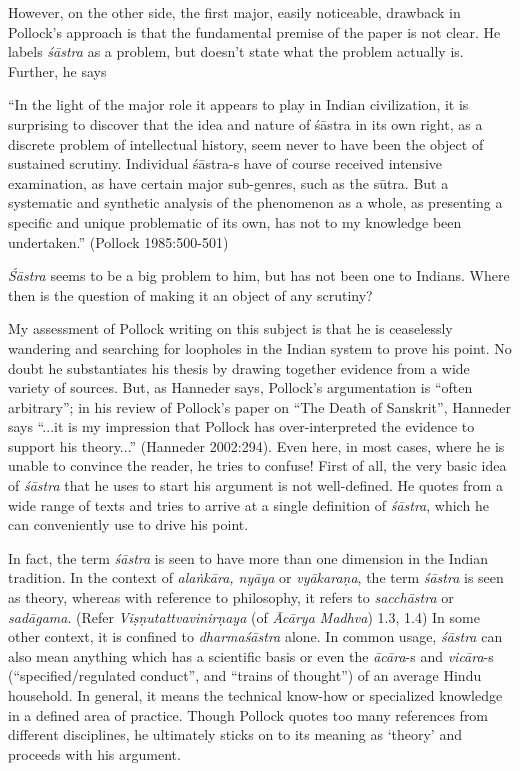 However, on the other side, the first major, easily noticeable, drawback in Pollock's approach is that the fundamental premise of the paper is not clear. He labels {\it śāstra} as a problem, but doesn't state what the problem actually is. Further, he says
\begin{myquote}
``In the light of the major role it appears to play in Indian civilization, it is surprising to discover that the idea and nature of śāstra in its own right, as a discrete problem of intellectual history, seem never to have been the object of sustained scrutiny. Individual śāstra-s have of course received intensive examination, as have certain major sub-genres, such as the sūtra. But a systematic and synthetic analysis of the phenomenon as a whole, as presenting a specific and unique problematic of its own, has not to my knowledge been undertaken.'' (Pollock 1985:500-501)
\end{myquote}

{\it Śāstra} seems to be a big problem to him, but has not been one to Indians. Where then is the question of making it an object of any scrutiny? 

My assessment of Pollock writing on this subject is that he is ceaselessly wandering and searching for loopholes in the Indian system to prove his point. No doubt he substantiates his thesis by drawing together evidence from a wide variety of sources. But, as Hanneder says, Pollock's argumentation is ``often arbitrary''; in his review of Pollock's paper on ``The Death of Sanskrit'', Hanneder says ``...it is my impression that Pollock has over-interpreted the evidence to support his theory...'' (Hanneder 2002:294). Even here, in most cases, where he is unable to convince the reader, he tries to confuse! First of all, the very basic idea of {\it śāstra} that he uses to start his argument is not well-defined. He quotes from a wide range of texts and tries to arrive at a single definition of {\it śāstra}, which he can conveniently use to drive his point. 

In fact, the term {\it śāstra} is seen to have more than one dimension in the Indian tradition. In the context of {\it alaṅkāra, nyāya} or {\it vyākaraṇa}, the term {\it śāstra} is seen as theory, whereas with reference to philosophy, it refers to {\it sacchāstra} or {\it sadāgama}. (Refer {\it Viṣṇutattvavinirṇaya} (of {\it Ācārya Madhva}) 1.3, 1.4)  In some other context, it is confined to {\it dharmaśāstra} alone. In common usage, {\it śāstra} can also mean anything which has a scientific basis or even the {\it ācāra}-s and {\it vicāra}-s (``specified/regulated conduct'', and ``trains of thought'') of an average Hindu household. In general, it means the technical know-how or specialized knowledge in a defined area of practice. Though Pollock quotes too many references from different disciplines, he ultimately sticks on to its meaning as `theory' and proceeds with his argument. 

